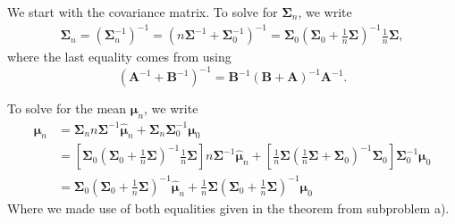\documentclass[12pt, a4paper]{article}
\newcommand{\vect}[1]{\bm{#1}}
\begin{document}
\begin{easylist}[enumerate]
	We start with the covariance matrix. 
	To solve for $\vect{\Sigma}_n$, we write
	\begin{align*}
		\vect{\Sigma}_n = \left(\vect{\Sigma}_n^{-1}\right)^{-1} = \left(  n \vect{\Sigma}^{-1} + \vect{\Sigma}_0^{-1} \right)^{-1} = 
		\vect{\Sigma}_0 \left( \vect{\Sigma}_0 + \frac{1}{n}  \vect{\Sigma} \right)^{-1} \frac{1}{n} \vect{\Sigma},
	\end{align*}
	where the last equality comes from using 
	\begin{equation*}
		\left( \vect{A}^{-1} + \vect{B}^{-1}\right)^{-1} =
		\vect{B}^{-1} \left( \vect{B} + \vect{A} \right)^{-1} \vect{A}^{-1}.
	\end{equation*}
	
	To solve for the mean $\vect{\mu}_n$, we write
	\begin{align*}
		\vect{\mu}_n 
		&= \vect{\Sigma}_n n \vect{\Sigma}^{-1} \hat{\vect{\mu}}_n 
		+
		\vect{\Sigma}_n \vect{\Sigma}^{-1}_0  \vect{\mu}_0
		\\ &=
		\left[ \vect{\Sigma}_0 \left( \vect{\Sigma}_0 + \frac{1}{n}  \vect{\Sigma} \right)^{-1} \frac{1}{n} \vect{\Sigma} \right] n \vect{\Sigma}^{-1} \hat{\vect{\mu}}_n 
		+
		\left[  \frac{1}{n} \vect{\Sigma} \left(  \frac{1}{n}  \vect{\Sigma} + \vect{\Sigma}_0  \right)^{-1}  \vect{\Sigma}_0 \right] \vect{\Sigma}^{-1}_0  \vect{\mu}_0 \\
		& = 
		 \vect{\Sigma}_0 \left( \vect{\Sigma}_0 + \frac{1}{n}  \vect{\Sigma} \right)^{-1}  \hat{\vect{\mu}}_n 
		+
		 \frac{1}{n} \vect{\Sigma} \left( \vect{\Sigma}_0 + \frac{1}{n}  \vect{\Sigma}  \right)^{-1}   \vect{\mu}_0 
	\end{align*}
	Where we made use of both equalities given in the theorem from subproblem a).
\end{easylist}
\end{document}
